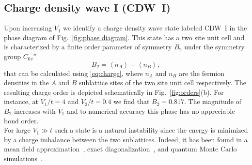 \documentclass[aps,prx,10pt,twocolumn,floatfix,superscriptaddress,showpacs,numerical,footinbib]{revtex4-1}
\begin{document}
\subsection{Charge density wave I (CDW~I)}
%
Upon increasing $V_{1}$ we identify a charge density wave state labeled CDW~I in the phase diagram of Fig.~\ref{fig:phase diagram}.
%
This state has a two site unit cell and is characterized by a finite order parameter of symmetry $B_2$ under the symmetry group $C_{6v}''$ \cite{Basko08}
%
\begin{equation}
\label{eq:CDW}
%
B_2=\left\langle n_{A} \right\rangle-\left\langle n_{B}\right\rangle,
%
\end{equation}
%
that can be calculated using \eqref{eq:charge}, where $n_{A}$ and $n_{B}$ are the fermion densities in the $A$ and $B$ sublattice sites of the two site unit cell respectively. 
%
The resulting charge order is depicted schematically in Fig.~\ref{fig:orders}(b). 
%
For instance, at $V_{1}/t = 4$ and $V_{2}/t = 0.4$ we find that $B_2=0.817$.
%
The magnitude of $B_2$ increases with $V_{1}$ and to numerical accuracy this phase has no appreciable bond order.\\
For large $V_{1}\gg t$ such a state is a natural instability since the energy is minimized by a charge imbalance between the two sublattices.
%
Indeed, it has been found in a mean field approximation~\cite{RQHZ08,WF10,GCC13}, exact diagonalization~\cite{GGNVC13,DH14,DCH14}, 
and quantum Monte Carlo simulations~\cite{WCT14,LJY14b}.
%
\end{document}
